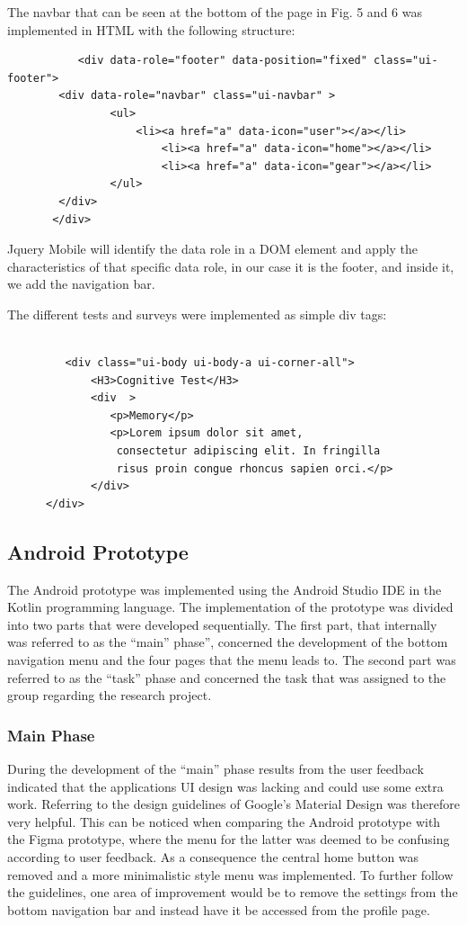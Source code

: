 \documentclass{article}
\begin{document}
The navbar that can be seen at the bottom of the page in Fig. 5 and 6 was implemented in HTML with the following structure: 

\begin{verbatim}
           <div data-role="footer" data-position="fixed" class="ui-footer">         
       	<div data-role="navbar" class="ui-navbar" >
            	<ul>
                  	<li><a href="a" data-icon="user"></a></li>
                        <li><a href="a" data-icon="home"></a></li>
                        <li><a href="a" data-icon="gear"></a></li>
            	</ul>
       	</div>
       </div>
\end{verbatim}
Jquery Mobile will identify the data role in a DOM element and apply the characteristics of that specific data role, in our case it is the footer, and inside it, we add the navigation bar.

The different tests and surveys were implemented as simple div tags: 

\begin{verbatim}
    
         <div class="ui-body ui-body-a ui-corner-all">   
             <H3>Cognitive Test</H3>
             <div  >
             	<p>Memory</p>
             	<p>Lorem ipsum dolor sit amet, 
             	 consectetur adipiscing elit. In fringilla 
             	 risus proin congue rhoncus sapien orci.</p>
     		 </div>       
      </div>
\end{verbatim}

\subsection{Android Prototype}
The Android prototype was implemented using the Android Studio IDE in the Kotlin programming language. The implementation of the prototype was divided into two parts that were developed sequentially. The first part, that internally was referred to as the “main” phase”, concerned the development of the bottom navigation menu and the four pages that the menu leads to. The second part was referred to as the “task” phase and concerned the task that was assigned to the group regarding the research project. 

\subsubsection{Main Phase}
During the development of the “main” phase results from the user feedback indicated that the applications UI design was lacking and could use some extra work. Referring to the design guidelines of Google’s Material Design was therefore very helpful.\cite{noauthor_material_nodate} This can be noticed when comparing the Android prototype with the Figma prototype, where the menu for the latter was deemed to be confusing according to user feedback. As a consequence the central home button was removed and a more minimalistic style menu was implemented. To further follow the guidelines, one area of improvement would be to remove the settings from the bottom navigation bar and instead have it be accessed from the profile page.
\end{document}

